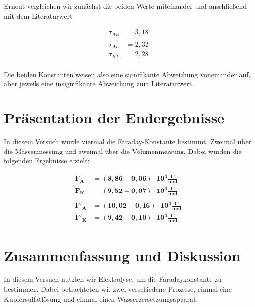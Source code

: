 \documentclass{article}
\begin{document}
Erneut vergleichen wir zunächst die beiden Werte miteinander und anschließend mit dem Literaturwert:

\begin{equation}
    \begin{split}
        \sigma_{AK} &= 3,18 \\ \\
        \sigma_{AL} &= 2,32 \\
        \sigma_{KL} &= 2,28 \\
    \end{split}
\end{equation}

Die beiden Konstanten weisen also eine signifikante Abweichung voneinander auf, aber jeweils eine insignifikante Abweichung zum Literaturwert.

\newpage
\section{Präsentation der Endergebnisse}

In diesem Versuch wurde viermal die Faraday-Konstante bestimmt. Zweimal über die Massenmessung und zweimal über die Volumenmessung. Dabei wurden die folgenden Ergebnisse erzielt:

\begin{equation}
    \begin{split}
        \bm{F_A} &= \bm{(8,86\pm 0,06) \cdot 10^{4} \frac{\textbf{C}}{\textbf{mol}}} \\
        \bm{F_K} &= \bm{(9,52 \pm 0,07) \cdot 10^{4} \frac{\textbf{C}}{\textbf{mol}}} \\ \\        
        \bm{F'_A} &= \bm{(10,02 \pm 0,16) \cdot 10^{4} \frac{\textbf{C}}{\textbf{mol}}} \\
        \bm{F'_K} &= \bm{(9,42 \pm 0,10) \cdot 10^{4} \frac{\textbf{C}}{\textbf{mol}}} \\
    \end{split}
\end{equation}


\newpage
\section{Zusammenfassung und Diskussion}

In diesem Versuch nutzten wir Elektrolyse, um die Faradaykonstante zu bestimmen. Dabei betrachteten wir zwei verschiedene Prozesse, einmal eine Kupfersulfatlösung und einmal einen Wasserzersetzungsapparat. 
\end{document}
